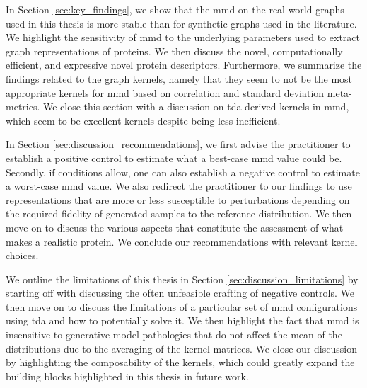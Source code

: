 In Section \ref{sec:key_findings}, we show that the \gls{mmd} on the real-world
graphs used in this thesis is more stable than for synthetic graphs used in the
literature. We highlight the sensitivity of \gls{mmd} to the underlying
parameters used to extract graph representations of proteins. We then discuss
the novel, computationally efficient, and expressive novel protein descriptors.
Furthermore, we summarize the findings related to the graph kernels, namely that
they seem to not be the most appropriate kernels for \gls{mmd} based on
correlation and standard deviation meta-metrics. We close this section with a
discussion on \gls{tda}-derived kernels in \gls{mmd}, which seem to be excellent
kernels despite being less inefficient.

In Section \ref{sec:discussion_recommendations}, we first advise the
practitioner to establish a positive control to estimate what a best-case
\gls{mmd} value could be. Secondly, if conditions allow, one can also
establish a negative control to estimate a worst-case \gls{mmd} value. We
also redirect the practitioner to our findings to use representations that are
more or less susceptible to perturbations depending on the required fidelity of
generated samples to the reference distribution. We then move on to discuss the
various aspects that constitute the assessment of what makes a realistic
protein. We conclude our recommendations with relevant kernel choices.

We outline the limitations of this thesis in Section
\ref{sec:discussion_limitations} by starting off with discussing the often
unfeasible crafting of negative controls. We then move on to discuss the
limitations of a particular set of \gls{mmd} configurations using \gls{tda} and how to
potentially solve it. We then highlight the fact that \gls{mmd} is insensitive to
generative model pathologies that do not affect the mean of the distributions
due to the averaging of the kernel matrices. We close our discussion by
highlighting the composability of the kernels, which could greatly expand the
building blocks highlighted in this thesis in future work.
